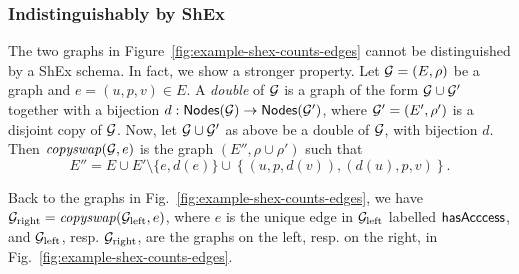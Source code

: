 \subsubsection{Indistinguishably by ShEx}
\label{app:indistinguishabilityShEx}


The two graphs in Figure~\ref{fig:example-shex-counts-edges} cannot be distinguished by a ShEx schema.
In fact, we show a stronger property. 
Let $\mathcal{G} = (E, \rho)$ be a graph and $e = (u, p, v) \in E$.
%
A \emph{double} of $\mathcal{G}$ is a graph of the form $\mathcal{G} \cup \mathcal{G}'$ together with a bijection $d: \mathsf{Nodes}(\mathcal{G}) \to \mathsf{Nodes}(\mathcal{G}')$, where $\mathcal{G}' = (E', \rho')$ is a disjoint copy of $\mathcal{G}$.
%
Now, let $\mathcal{G} \cup \mathcal{G}'$ as above be a double of $\mathcal{G}$, with bijection $d$.
Then $\mathit{copyswap}(\mathcal{G}, e)$ is the graph $(E'', \rho \cup \rho')$ such that 
$$E'' = E \cup E' \setminus \{e, d(e)\} \cup \left\{(u, p, d(v)), (d(u), p, v)\right\}.$$

Back to the graphs in Fig.~\ref{fig:example-shex-counts-edges}, we have $\mathcal{G}_{\text{right}} = \mathit{copyswap}(\mathcal{G}_{\text{left}}, e)$, where $e$ is the unique edge in $\mathcal{G}_{\text{left}}$ labelled $\mathsf{hasAcccess}$, and $\mathcal{G}_{\text{left}}$, resp. $\mathcal{G}_{\text{right}}$, are the graphs on the left, resp. on the right, in Fig.~\ref{fig:example-shex-counts-edges}.

